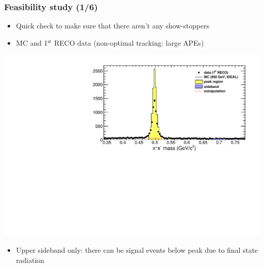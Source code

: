 \documentclass[compress]{beamer}
\begin{document}
\begin{frame}
\frametitle{Feasibility study (1/6)}
\begin{itemize}
\item Quick check to make sure that there aren't any show-stoppers
\item MC and 1$^{\mbox{st}}$ RECO data (non-optimal tracking: large APEs)
\end{itemize}

\includegraphics[width=\linewidth]{kaonTracking_masspeak.pdf}

\begin{itemize}
\item Upper sideband only: there can be signal events below peak due
  to final state radiation
\end{itemize}
\end{frame}
\end{document}
